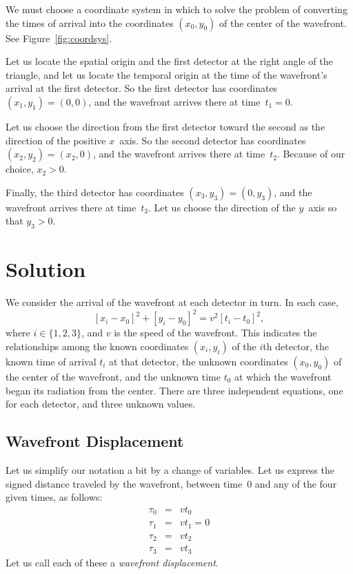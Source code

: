 \documentclass[twocolumn]{article}
\begin{document}
We must choose a coordinate system in which to solve the problem of converting
the times of arrival into the coordinates $(x_0, y_0)$ of the center of the
wavefront.  See Figure~\ref{fig:coordsys}.

Let us locate the spatial origin and the first detector at the right angle of
the triangle, and let us locate the temporal origin at the time of the
wavefront's arrival at the first detector.  So the first detector has
coordinates $(x_1, y_1) = (0, 0)$, and the wavefront arrives there at time~$t_1
= 0$.

Let us choose the direction from the first detector toward the second
as the direction of the positive $x$~axis.  So the second detector has
coordinates $(x_2, y_2) = (x_2, 0)$, and the wavefront arrives there at
time~$t_2$.  Because of our choice, $x_2 > 0$.

Finally, the third detector has coordinates $(x_3, y_3) = (0, y_3)$, and the
wavefront arrives there at time~$t_3$.  Let us choose the direction of the
$y$~axis so that $y_3 > 0$.

\section{Solution}

We consider the arrival of the wavefront at each detector in turn.  In each
case,
\begin{equation}
   \left[x_i - x_0\right]^2 + \left[y_i - y_0\right]^2 = v^2 \left[t_i -
   t_0\right]^2,
\end{equation}
where $i \in \{1, 2, 3\}$, and $v$ is the speed of the wavefront.  This
indicates the relationships among the known coordinates $(x_i, y_i)$ of the
$i$th detector, the known time of arrival $t_i$ at that detector, the unknown
coordinates $(x_0, y_0)$ of the center of the wavefront, and the unknown time
$t_0$ at which the wavefront began its radiation from the center.  There are
three independent equations, one for each detector, and three unknown values.

\subsection{Wavefront Displacement}

Let us simplify our notation a bit by a change of variables.  Let us express
the signed distance traveled by the wavefront, between time~0 and any of the
four given times, as follows:
\begin{eqnarray}
   \tau_0 &=& vt_0\\
   \tau_1 &=& vt_1 = 0\\
   \tau_2 &=& vt_2\\
   \tau_3 &=& vt_3
\end{eqnarray}
Let us call each of these a \emph{wavefront displacement}.
\end{document}
